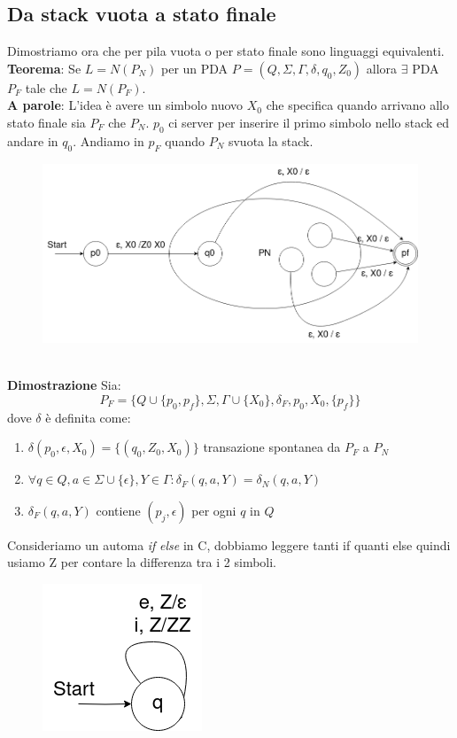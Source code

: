 \documentclass[12pt]{article}
\begin{document}
\subsection{Da stack vuota a stato finale} 
Dimostriamo ora che per pila vuota o per stato finale sono linguaggi equivalenti. 
\\ \textbf{Teorema}: Se $L=N(P_N)$ per un PDA $P=(Q,\Sigma, \Gamma, \delta, q_0, Z_0)$ allora $\exists$ PDA $P_F$ tale che $L=N(P_F)$.
\\ \textbf{A parole}: L'idea è avere un simbolo nuovo $X_0$ che specifica quando arrivano allo stato finale sia $P_F$ che $P_N$. $p_0$ ci server per inserire il primo simbolo nello stack ed andare in $q_0$. Andiamo in $p_F$ quando $P_N$ svuota la stack. 
\begin{figure}[ht]
	\includegraphics[scale = 0.4]{media/PNPF.png}
	\centering
\end{figure}
\\
\textbf{Dimostrazione} Sia: 
\[P_F = \{Q \cup \{p_0, p_f\}, \Sigma, \Gamma \cup \{ X_0\}, \delta_F, p_0, X_0, \{p_f\}\}\]
dove $\delta$ è definita come: 
\begin{enumerate}
  \item $\delta(p_0,\epsilon, X_0)=\{(q_0,Z_0, X_0)\}$
    transazione spontanea da $P_F$ a $P_N$
  \item $\forall q \in Q,a \in \Sigma \cup \{\epsilon\}, Y \in \Gamma: \delta_F(q,a,Y) =\delta_N(q,a,Y)$
  \item $\delta_F(q,a,Y)$ contiene $(p_j, \epsilon)$ per ogni $q$ in $Q$
\end{enumerate}

\newpage
Consideriamo un automa \emph{if} \emph{else} in C, dobbiamo leggere tanti if quanti else quindi usiamo Z per contare la differenza tra i 2 simboli.

\begin{figure}[ht]
	\includegraphics[scale = 0.4]{media/if_else.png}
	\centering
\end{figure}
\end{document}
